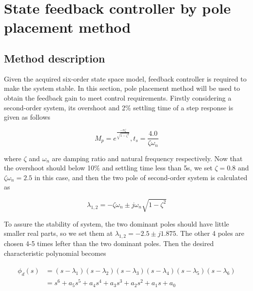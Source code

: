 \documentclass[hyperref]{article}
\theoremstyle{nonumberplain}
\begin{document}
	\section{State feedback controller by pole placement method}
	
	\subsection{Method description}
	
	\hspace{1.0em}
	Given the acquired six-order state space model, feedback controller is required to make the system stable. In this section, pole placement method will be used to obtain the feedback gain to meet control requirements. Firstly considering a second-order system, its overshoot and 2\% settling time of a step response is given as follows
	
	\begin{equation}
	M_{p}=e^{\frac{-\pi \zeta }{\sqrt{1-\zeta ^{2}}}}, t_{s}=\frac{4.0}{\zeta \omega _{n}}
	\label{eq6}
	\end{equation}
	
	where $\zeta$ and $\omega_{n}$ are damping ratio and natural frequency respectively. Now that the overshoot should below 10\% and settling time less than 5s, we set $\zeta=0.8$ and $\zeta\omega_{n}=2.5$ in this case, and then the two pole of second-order system is calculated as
	
	\begin{equation}
	\lambda _{1,2}=-\zeta \omega _{n}\pm j\omega _{n}\sqrt{1-\zeta ^{2}}
	\label{eq7}
	\end{equation}
	
	To assure the stability of system, the two dominant poles should have little smaller real parts, so we set them at $\lambda_{1,2}=-2.5\pm j1.875$. The other 4 poles are chosen 4-5 times lefter than the two dominant poles. Then the desired characteristic polynomial becomes
	
	\begin{equation}
	\begin{split}
	\begin{aligned}
		\phi _{d}(s)&=(s-\lambda _{1})(s-\lambda _{2})(s-\lambda _{3})(s-\lambda _{4})(s-\lambda _{5})(s-\lambda _{6})\\
		&=s^{6}+a_{5}s^{5}+a_{4}s^{4}+a_{3}s^{3}+a_{2}s^{2}+a_{1}s+a_{0}
	\end{aligned}
	\end{split}
	\label{eq8}
	\end{equation}
	
\end{document}

